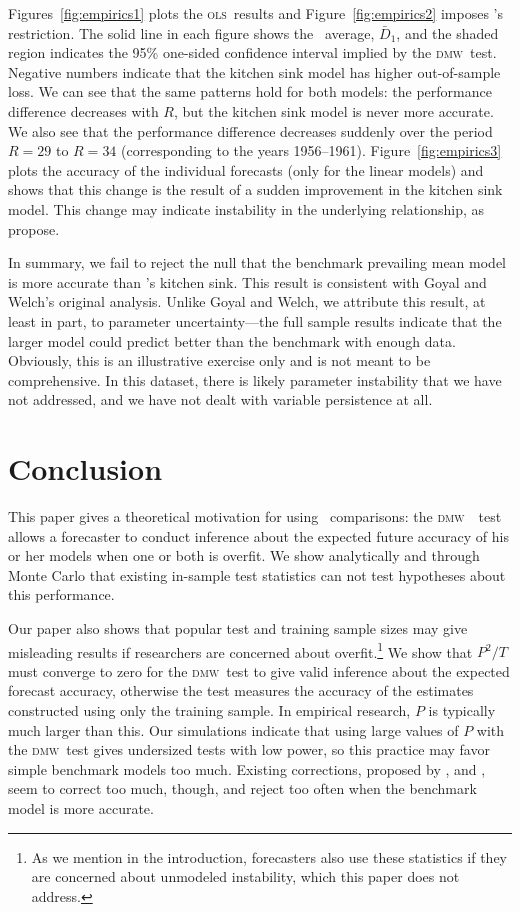 \documentclass[11pt]{article}
\newcommand{\citepos}[1]{\citeauthor{#1}'s \citeyearpar{#1}}
\newcommand{\dmw}{\textsc{dmw}}
\newcommand{\ols}{\textsc{ols}}
\begin{document}
Figures~\ref{fig:empirics1} plots the \ols\ results and
Figure~\ref{fig:empirics2} imposes
\citepos{campbell-thompson-2008-rfs} restriction.  The solid line
in each figure shows the \oos\ average, $\bar D_1$, and the shaded
region indicates the 95\% one-sided confidence interval implied by the
\dmw\ test.  Negative numbers indicate that the kitchen sink model has
higher out-of-sample loss.  We can see that the same patterns hold for
both models: the performance difference decreases with $R$, but the
kitchen sink model is never more accurate.  We also see that the
performance difference decreases suddenly over the period $R=29$ to
$R=34$ (corresponding to the years 1956--1961).
Figure~\ref{fig:empirics3} plots the accuracy of the individual
forecasts (only for the linear models) and shows that this change is
the result of a sudden improvement in the kitchen sink model.  This
change may indicate instability in the underlying relationship, as
\citet{goyal-welch-2008-rfs} propose.

In summary, we fail to reject the null that the benchmark prevailing
mean model is more accurate than \citepos{goyal-welch-2008-rfs}
kitchen sink.  This result is consistent with Goyal and Welch's
original analysis.  Unlike Goyal and Welch, we attribute this result,
at least in part, to parameter uncertainty---the full sample results
indicate that the larger model could predict better than the
benchmark with enough data.  Obviously, this is an illustrative
exercise only and is not meant to be comprehensive.  In this dataset,
there is likely parameter instability that we have not addressed, and
we have not dealt with variable persistence at all.
\section{Conclusion}\label{sec:conclusion}
This paper gives a theoretical motivation for using \oos\ comparisons:
the \dmw\ \oos\ test allows a forecaster to conduct inference about
the expected future accuracy of his or her models when one or both is
overfit.  We show analytically and through Monte Carlo that existing
in-sample test statistics can not test hypotheses about this
performance.

Our paper also shows that popular test and training sample sizes may
give misleading results if researchers are concerned about
overfit.\footnote{As we mention in the introduction, forecasters also
  use these statistics if they are concerned about unmodeled
  instability, which this paper does not address.}  We show that
$P^2/T$ must converge to zero for the \dmw\ test to give valid
inference about the expected forecast accuracy, otherwise the test
measures the accuracy of the estimates constructed using only the
training sample.  In empirical research, $P$ is typically much larger
than this.  Our simulations indicate that using large values of $P$
with the \dmw\ test gives undersized tests with low power, so this
practice may favor simple benchmark models too much.  Existing
corrections, proposed by
\citet{clark_tests_2001,clark_evaluating_2005},
\citet{mccracken_asymptotics_2007} and
\citet{clark_using_2006,clark_approximately_2007}, seem to correct too
much, though, and reject too often when the benchmark model is more
accurate.
\end{document}
